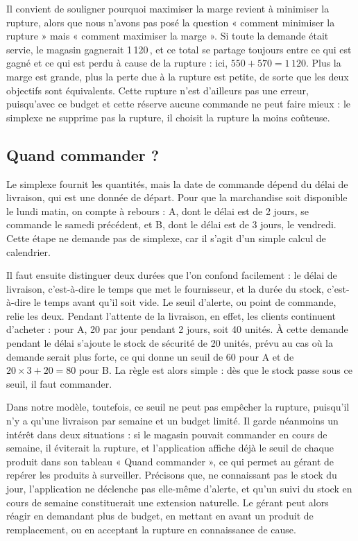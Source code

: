 \documentclass[11pt,a4paper]{article}
\newcommand{\eur}{\,\text{€}}
\begin{document}
Il convient de souligner pourquoi maximiser la marge revient à minimiser la rupture, alors que
nous n'avons pas posé la question « comment minimiser la rupture » mais « comment maximiser la
marge ». Si toute la demande était servie, le magasin gagnerait 1\,120\eur, et ce total se
partage toujours entre ce qui est gagné et ce qui est perdu à cause de la rupture : ici,
$550 + 570 = 1\,120$. Plus la marge est grande, plus la perte due à la rupture est petite, de
sorte que les deux objectifs sont équivalents. Cette rupture n'est d'ailleurs pas une erreur,
puisqu'avec ce budget et cette réserve aucune commande ne peut faire mieux : le simplexe ne
supprime pas la rupture, il choisit la rupture la moins coûteuse.

\subsection{Quand commander ?}
Le simplexe fournit les quantités, mais la date de commande dépend du délai de livraison, qui
est une donnée de départ. Pour que la marchandise soit disponible le lundi matin, on compte à
rebours : A, dont le délai est de 2 jours, se commande le samedi précédent, et B, dont le délai
est de 3 jours, le vendredi. Cette étape ne demande pas de simplexe, car il s'agit d'un simple
calcul de calendrier.

Il faut ensuite distinguer deux durées que l'on confond facilement : le délai de livraison,
c'est-à-dire le temps que met le fournisseur, et la durée du stock, c'est-à-dire le temps avant
qu'il soit vide. Le seuil d'alerte, ou point de commande, relie les deux. Pendant l'attente de
la livraison, en effet, les clients continuent d'acheter : pour A, 20 par jour pendant 2 jours,
soit 40 unités. À cette demande pendant le délai s'ajoute le stock de sécurité de 20 unités,
prévu au cas où la demande serait plus forte, ce qui donne un seuil de 60 pour A et de
$20 \times 3 + 20 = 80$ pour B. La règle est alors simple : dès que le stock passe sous ce
seuil, il faut commander.

Dans notre modèle, toutefois, ce seuil ne peut pas empêcher la rupture, puisqu'il n'y a
qu'une livraison par semaine et un budget limité. Il garde néanmoins un intérêt dans deux
situations : si le magasin pouvait commander en cours de semaine, il éviterait la rupture, et
l'application affiche déjà le seuil de chaque produit dans son tableau « Quand commander »,
ce qui permet au gérant de repérer les produits à surveiller. Précisons que, ne connaissant
pas le stock du jour, l'application ne déclenche pas elle-même d'alerte, et qu'un suivi du
stock en cours de semaine constituerait une extension naturelle. Le gérant peut alors réagir
en demandant plus de budget, en mettant en avant un produit de remplacement, ou en acceptant
la rupture en connaissance de cause.
\end{document}

